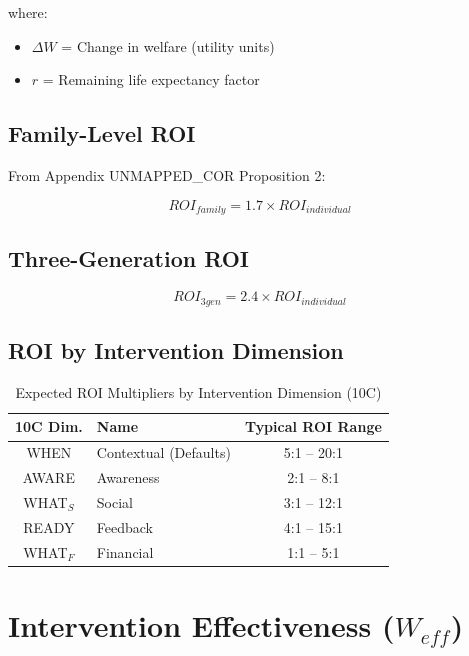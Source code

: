 where:
\begin{itemize}
\item $\Delta W$ = Change in welfare (utility units)
\item $r$ = Remaining life expectancy factor
\end{itemize}

\subsection{Family-Level ROI}

From Appendix UNMAPPED_COR Proposition 2:

\begin{equation}
\boxed{
ROI_{family} = 1.7 \times ROI_{individual}
}
\label{eq:roi-family}
\end{equation}

\subsection{Three-Generation ROI}

\begin{equation}
ROI_{3gen} = 2.4 \times ROI_{individual}
\label{eq:roi-3gen}
\end{equation}

\subsection{ROI by Intervention Dimension}

\begin{table}[htbp]
\centering
\caption{Expected ROI Multipliers by Intervention Dimension (10C)}
\label{tab:roi-types}
\renewcommand{\arraystretch}{1.3}
\begin{tabular}{@{}clc@{}}
\toprule
\textbf{10C Dim.} & \textbf{Name} & \textbf{Typical ROI Range} \\
\midrule
WHEN & Contextual (Defaults) & 5:1 -- 20:1 \\
AWARE & Awareness & 2:1 -- 8:1 \\
WHAT$_S$ & Social & 3:1 -- 12:1 \\
READY & Feedback & 4:1 -- 15:1 \\
WHAT$_F$ & Financial & 1:1 -- 5:1 \\
\bottomrule
\end{tabular}
\end{table}


\section{Intervention Effectiveness ($W_{eff}$)}
\label{sec:calc-weff}

